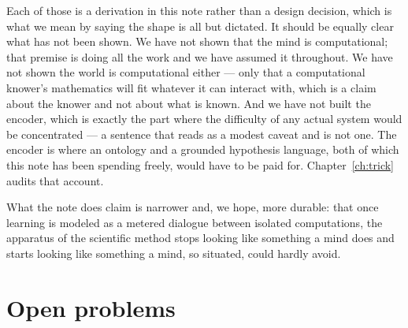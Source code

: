 Each of those is a derivation in this note rather than a design decision, which is what we mean by
saying the shape is all but dictated. It should be equally clear what has not been shown. We have not
shown that the mind is computational; that premise is doing all the work and we have assumed it
throughout. We have not shown the world is computational either --- only that a computational knower's
mathematics will fit whatever it can interact with, which is a claim about the knower and not about
what is known. And we have not built the encoder, which is exactly the part where the difficulty of
any actual system would be concentrated --- a sentence that reads as a modest caveat and is not one. The
encoder is where an ontology and a grounded hypothesis language, both of which this note has been
spending freely, would have to be paid for. Chapter~\ref{ch:trick} audits that account.

What the note does claim is narrower and, we hope, more durable: that once learning is modeled as a
metered dialogue between isolated computations, the apparatus of the scientific method stops looking
like something a mind does and starts looking like something a mind, so situated, could hardly avoid.

\section{Open problems}\label{sci:S18}
\label{sci:sec:open}

